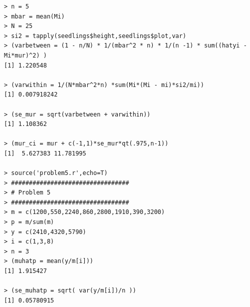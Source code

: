 \documentclass[usenames,dvipsnames]{homework}
\begin{document}
\begin{lstlisting}
> n = 5 
> mbar = mean(Mi) 
> N = 25 
> si2 = tapply(seedlings$height,seedlings$plot,var) 
> (varbetween = (1 - n/N) * 1/(mbar^2 * n) * 1/(n -1) * sum((hatyi - Mi*mur)^2) )
[1] 1.220548

> (varwithin = 1/(N*mbar^2*n) *sum(Mi*(Mi - mi)*si2/mi))
[1] 0.007918242

> (se_mur = sqrt(varbetween + varwithin))
[1] 1.108362

> (mur_ci = mur + c(-1,1)*se_mur*qt(.975,n-1))
[1]  5.627383 11.781995

> source('problem5.r',echo=T)
> #################################
> # Problem 5
> #################################
> m = c(1200,550,2240,860,2800,1910,390,3200) 
> p = m/sum(m) 
> y = c(2410,4320,5790) 
> i = c(1,3,8) 
> n = 3 
> (muhatp = mean(y/m[i]))
[1] 1.915427

> (se_muhatp = sqrt( var(y/m[i])/n ))
[1] 0.05780915

\end{lstlisting}
\end{document}
